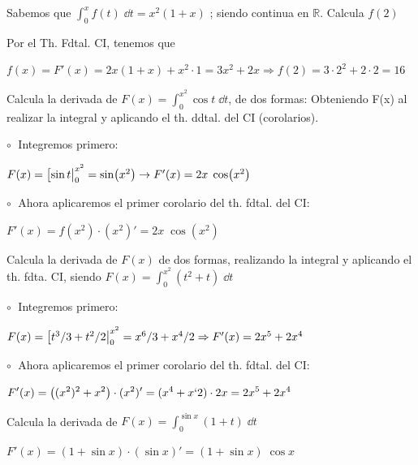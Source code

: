 \begin{ejre}
Sabemos que $\displaystyle \int_0^x f(t)\; \dd t = 
x^2 (1+x)$ ; siendo continua en $\mathbb R$. Calcula $f(2)$
\end{ejre}

\begin{proofw}\renewcommand{\qedsymbol}{$\diamond$}	
Por el Th. Fdtal. CI, tenemos que

$f(x)=F'(x)=2x(1+x)+x^2\cdot 1=3x^2+2x \Rightarrow f(2)=3\cdot 2^2 + 2\cdot 2 = 16$	
\end{proofw}

\begin{ejre}

Calcula la derivada de $F(x)=\displaystyle \int_0^{x^2} \cos t \; \dd t$, de dos formas: Obteniendo F(x) al realizar la integral y aplicando el th. ddtal. del CI (corolarios).
\end{ejre}

\begin{proofw}\renewcommand{\qedsymbol}{$\diamond$}	
$\circ\; $ Integremos primero:

\hspace{15mm} $F(x)= \eval[\sin t|_0^{x^2}=\sin (x^2)	\to F'(x)= 2x\; \cos (x^2)$

$\circ\; $ Ahora aplicaremos el primer corolario del th. fdtal. del CI:

\hspace{15mm}  $F'(x)=f(x^2)\cdot (x^2)'=2x\; \cos (x^2)$

\end{proofw}

\begin{ejre}
Calcula la derivada de $F(x)$ de dos formas, realizando la integral y aplicando el th. fdta. CI, siendo $F(x)=\displaystyle \int_0^{x^2} (t^2+t)\; \dd t$
 \end{ejre}
 \begin{proofw}\renewcommand{\qedsymbol}{$\diamond$}	

 $\circ\; $ Integremos primero:
 
 $F(x)=\eval[t^3/3 +t^2/2|_0^{x^2}=x^6/3+x^4/2 \Rightarrow F'(x)= 2x^5+2x^4$
 
 $\circ\; $ Ahora aplicaremos el primer corolario del th. fdtal. del CI:
 
 $\displaystyle F'(x)=\left( (x^2)^2+x^2 \right)\cdot (x^2)'=(x^4+x`2)\cdot 2x=2x^5+2x^4$
\end{proofw}

\begin{ejre}
	Calcula la derivada de $F(x)=\displaystyle \int_0^{\sin x} (1+t) \; \dd t$
\end{ejre}
\begin{proofw}\renewcommand{\qedsymbol}{$\diamond$}		
	$F'(x)=(1+\sin x )\cdot (\sin x)'= (1+\sin x) \; \cos x$ 
\end{proofw}

